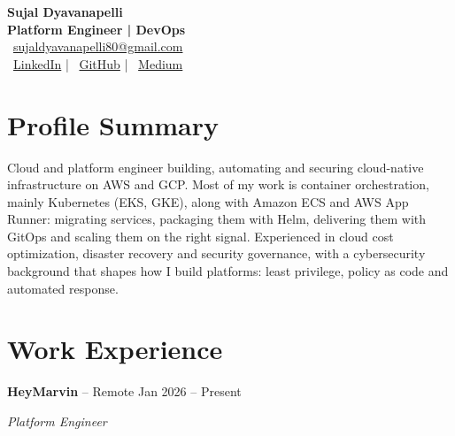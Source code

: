 \documentclass[11pt, a4paper]{article}
\begin{document}

\begin{center}
    {\LARGE\bfseries Sujal Dyavanapelli}\\[0.3em]
    \textbf{\large Platform Engineer | DevOps}\\[0.5em]

    \faEnvelope\ \href{mailto:sujaldyavanapelli80@gmail.com}{sujaldyavanapelli80@gmail.com}
    \\[0.3em]

    \faLinkedin\ \href{https://www.linkedin.com/in/dyavanapelli-sujal-409766249/}{LinkedIn}
    \quad | \quad
    \faGithub\ \href{https://github.com/dyavanapellisujal}{GitHub}
    \quad | \quad
    \faMedium\ \href{https://medium.com/@dyavanapellisujal7}{Medium}
\end{center}


\section*{Profile Summary}

Cloud and platform engineer building, automating and securing cloud-native infrastructure on AWS and GCP. Most of my work is container orchestration, mainly Kubernetes (EKS, GKE), along with Amazon ECS and AWS App Runner: migrating services, packaging them with Helm, delivering them with GitOps and scaling them on the right signal. Experienced in cloud cost optimization, disaster recovery and security governance, with a cybersecurity background that shapes how I build platforms: least privilege, policy as code and automated response.


\section*{Work Experience}

\textbf{HeyMarvin} -- Remote \hfill Jan 2026 -- Present

\textit{Platform Engineer}
\end{document}
